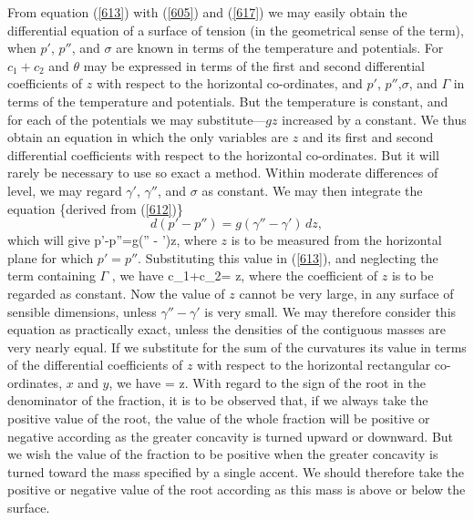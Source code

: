 \documentclass[12pt]{article}
\begin{document}
From equation (\ref{613}) with (\ref{605}) and (\ref{617}) we may easily obtain the differential equation of a surface of tension (in the geometrical sense of the term), when $p'$, $p''$, and $\sigma$ are known in terms of the temperature and potentials. For $c_1+c_2$ and $\theta$ may be expressed in terms of the first and second differential coefficients of $z$ with respect to the horizontal co-ordinates, and $p'$, $p''$,$\sigma$, and $\Gamma$ in terms of the temperature and potentials. But the temperature is constant, and for each of the potentials we may substitute---$gz$ increased by a constant. We thus obtain an equation in which the only variables are $z$ and its first and second differential coefficients with respect to the horizontal co-ordinates. But it will rarely be necessary to use so exact a method. Within moderate differences of level, we may regard $\gamma'$, $\gamma''$, and $\sigma$ as constant. We may then integrate the equation \{derived from (\ref{612})\}
$$d(p' -p'') = g(\gamma'' - \gamma') \, dz,$$
which will give
\eqs p'-p''=g(\gamma'' - \gamma')z,  \label{618} \eqe
where $z$ is to be measured from the horizontal plane for which $p'=p''$. Substituting this value in (\ref{613}), and neglecting the term containing  $\Gamma$ , we have
\eqs c_1+c_2=  z,  \label{619} \eqe
where the coefficient of $z$ is to be regarded as constant. Now the value of $z$ cannot be very large, in any surface of sensible dimensions, unless $\gamma'' - \gamma'$ is very small. We may therefore consider this equation as practically exact, unless the densities of the contiguous masses are very nearly equal. If we substitute for the sum of the curvatures its value in terms of the differential coefficients of $z$ with respect to the horizontal rectangular co-ordinates, $x$ and $y$, we have
\eqs 
{} = z.  \label{620} \eqe
With regard to the sign of the root in the denominator of the fraction, it is to be observed that, if we always take the positive value of the root, the value of the whole fraction will be positive or negative according as the greater concavity is turned upward or downward. But we wish the value of the fraction to be positive when the greater concavity is turned toward the mass specified by a single accent. We should therefore take the positive or negative value of the root according as this mass is above or below the surface.
\end{document}
